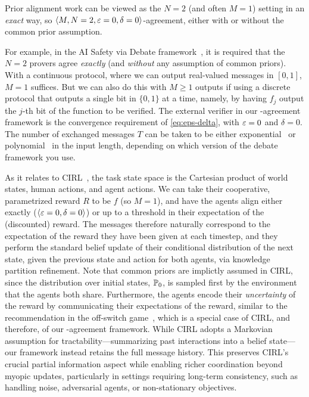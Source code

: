 \begin{remark}\label{rem:align}
Prior alignment work can be viewed as the $N=2$ (and often $M=1$) setting in an \emph{exact} way, so $\left \langle M, N=2, \varepsilon = 0, \delta = 0 \right \rangle $-agreement, either with or without the common prior assumption.

For example, in the AI Safety via Debate framework~\citep{irving2018ai,brown2023scalable}, it is required that the $N=2$ provers agree \emph{exactly} (and \emph{without} any assumption of common priors).
With a continuous protocol, where we can output real-valued messages in $[0,1]$, $M=1$ suffices.
But we can also do this with $M \ge 1$ outputs if using a discrete protocol that outputs a single bit in $\{0, 1\}$ at a time, namely, by having $f_j$ output the $j$-th bit of the function to be verified.
The external verifier in our \agree-agreement framework is the convergence requirement of \eqref{eq:eps-delta}, with $\varepsilon=0$ and $\delta=0$.
The number of exchanged messages $T$ can be taken to be either exponential~\citep{irving2018ai} or polynomial~\citep{brown2023scalable} in the input length, depending on which version of the debate framework you use.

As it relates to CIRL~\citep{hadfield2016cooperative}, the task state space is the Cartesian product of world states, human actions, and agent actions.
We can take their cooperative, parametrized reward $R$ to be $f$ (so $M = 1$), and have the agents align either exactly ($\left \langle \varepsilon=0, \delta=0 \right \rangle $) or up to a threshold in their expectation of the (discounted) reward.
The messages therefore naturally correspond to the expectation of the reward they have been given at each timestep, and they perform the standard belief update of their conditional distribution of the next state, given the previous state and action for both agents, via knowledge partition refinement.
Note that common priors are implictly assumed in CIRL, since the distribution over initial states, $\mathbb{P}_0$, is sampled first by the environment that the agents both share.
Furthermore, the agents encode their \emph{uncertainty} of the reward by communicating their expectations of the reward, similar to the recommendation in the off-switch game~\citep{hadfield2017off}, which is a special case of CIRL, and therefore, of our \agree-agreement framework.
While CIRL adopts a Markovian assumption for tractability---summarizing past interactions into a belief state---our framework instead retains the full message history. 
This preserves CIRL's crucial partial information aspect while enabling richer coordination beyond myopic updates, particularly in settings requiring long-term consistency, such as handling noise, adversarial agents, or non-stationary objectives.
\end{remark}

